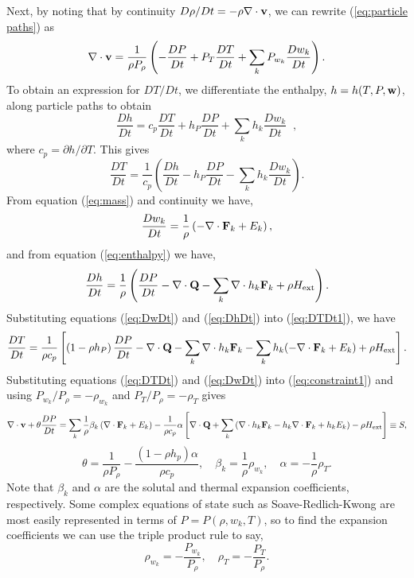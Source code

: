 \documentclass[final]{siamltex}
\def\Fb {{\bf F}}
\def\Qb {{\bf Q}}
\def\vb {{\bf v}}
\def\wb {{\bf w}}
\def\Hext {H_{\rm ext}}
\begin{document}
Next, by noting that by continuity $D\rho/Dt = -\rho\nabla\cdot\vb$, 
we can rewrite 
(\ref{eq:particle paths}) as
\begin{equation}
\nabla\cdot\vb = \frac{1}{\rho P_\rho}\left(-\frac{DP}{Dt} + P_T\frac{DT}{Dt} + \sum_kP_{w_k}\frac{Dw_k}{Dt}\right).\label{eq:constraint1}
\end{equation}
To obtain an expression for $DT/Dt$, we differentiate the enthalpy, $h=h(T,P,\wb)$, 
along particle paths to obtain
\begin{equation}
\frac{Dh}{Dt} = 
c_p \frac{DT}{Dt} 
+ h_P\frac{DP}{Dt} + \sum_k h_{k}\frac{Dw_k}{Dt}  \;\;  ,
\end{equation}
where $c_p = \partial h/\partial T$.  This gives
\begin{equation}
\frac{DT}{Dt} = \frac{1}{c_p}\left(\frac{Dh}{Dt} - h_P\frac{DP}{Dt} - \sum_kh_{k}\frac{Dw_k}{Dt}\right).\label{eq:DTDt1}
\end{equation}
From equation (\ref{eq:mass}) and continuity we have,
\begin{equation}
\frac{Dw_k}{Dt} = \frac{1}{\rho}\left(-\nabla\cdot\Fb_k + E_k\right),\label{eq:DwDt}
\end{equation}
and from equation (\ref{eq:enthalpy}) we have,
\begin{equation}
\frac{Dh}{Dt} = \frac{1}{\rho}\left(\frac{DP}{Dt} - \nabla\cdot\Qb - \sum_k\nabla\cdot h_k\Fb_k + \rho\Hext\right).\label{eq:DhDt}
\end{equation}
Substituting equations (\ref{eq:DwDt}) and (\ref{eq:DhDt}) into (\ref{eq:DTDt1}), we have
\begin{equation}
\frac{DT}{Dt} = \frac{1}{\rho c_p}\left[\left(1 - \rho h_P\right)\frac{DP}{Dt} - \nabla\cdot\Qb - \sum_k\nabla\cdot h_k\Fb_k - \sum_kh_k(-\nabla\cdot\Fb_k + E_k) + \rho\Hext\right].\label{eq:DTDt}
\end{equation}
Substituting equations (\ref{eq:DTDt}) and (\ref{eq:DwDt}) into (\ref{eq:constraint1})
and using $P_{w_k}/P_\rho = -\rho_{w_k}$ and $P_T/P_\rho = -\rho_T$ gives
\begin{equation}
\nabla\cdot\vb + \theta\frac{DP}{Dt} = \sum_k \frac{1}{\rho}\beta_k\left(\nabla\cdot\Fb_k + E_k\right) - \frac{1}{\rho c_p}\alpha\left[\nabla\cdot\Qb + \sum_k\left(\nabla\cdot h_k\Fb_k - h_k\nabla\cdot\Fb_k + h_kE_k\right) - \rho\Hext\right] \equiv S,\label{eq:constraint}
\end{equation}
\begin{equation}
\theta = \frac{1}{\rho P_\rho} - \frac{(1-\rho h_p)\alpha}{\rho c_p}, \quad
\beta_k = \frac{1}{\rho}\rho_{w_k}, \quad
\alpha = -\frac{1}{\rho}\rho_T.\label{eq:thermo deriv}
\end{equation}
Note that $\beta_k$ and $\alpha$
are the solutal and thermal expansion coefficients, respectively.
Some complex equations of state 
such as Soave-Redlich-Kwong \cite{RedlichKwong,Soave}
are most easily represented in terms of $P=P(\rho,w_k,T)$,
so to find the expansion coefficients we can use the triple product rule to say,
\begin{equation}
\rho_{w_k} = -\frac{P_{w_k}}{P_\rho}, \quad \rho_T = -\frac{P_T}{P_\rho}.
\end{equation}
\end{document}
